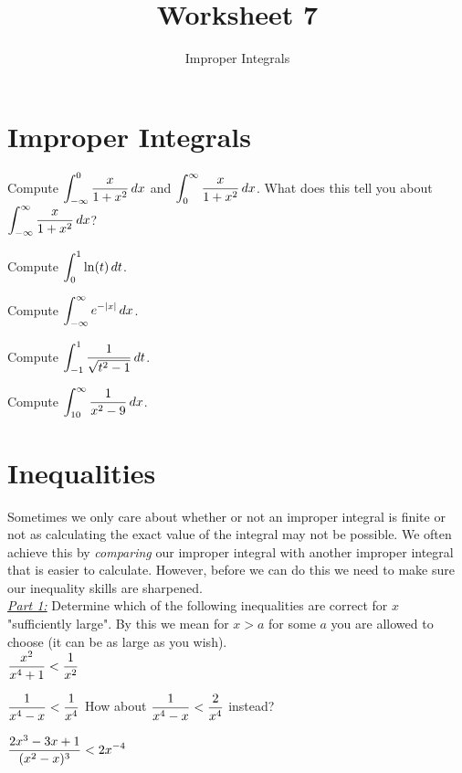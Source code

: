 \documentclass{article}
\title{Worksheet 7}
\subtitle{Improper Integrals}
\begin{document}
\maketitle

\section*{Improper Integrals}

\prob Compute $\displaystyle \int_{-\infty}^0 \frac{x} {1 + x^2} \,dx$ and $\displaystyle \int_0^{\infty} \frac{x} {1 + x^2}\,dx$.  What does this tell you about $\displaystyle \int_{-\infty}^{\infty} \frac{x} {1 + x^2}\,dx$?\vfill

\prob Compute $\displaystyle \int_0^1 \ln(t)\,dt$.\vfill

\newpage

\prob Compute $\displaystyle \int_{-\infty}^{\infty} e^{-|x|}\,dx$.\vfill

\prob Compute $\displaystyle \int_{-1}^1 \frac{1} {\sqrt{t^2 - 1}}\,dt$.\vfill

\newpage

\prob Compute $\displaystyle \int_{10}^{\infty} \frac{1}{x^2 - 9}\,dx$.\vfill

\section*{Inequalities}

Sometimes we only care about whether or not an improper integral is finite or not as calculating the exact value of the integral may not be possible.  We often achieve this by \emph{comparing} our improper integral with another improper integral that is easier to calculate.  However, before we can do this we need to make sure our inequality skills are sharpened.\\

\underline{\emph{Part 1:}} Determine which of the following inequalities are correct for $x$ "sufficiently large".  By this we mean for $x > a$ for some $a$ you are allowed to choose (it can be as large as you wish).\\

\prob $\displaystyle \frac{x^2}{x^4 + 1} < \frac{1}{x^2}$\vfill

\newpage

\prob $\displaystyle \frac{1}{x^4 - x} < \frac{1}{x^4}$ \qquad\quad  How about $\displaystyle \frac{1}{x^4 - x} < \frac{2}{x^4}$ instead?\vfill

\prob $\displaystyle \frac{2x^3 - 3x + 1}{(x^2 -x)^3} < 2x^{-4}$\vfill

\newpage
\end{document}
